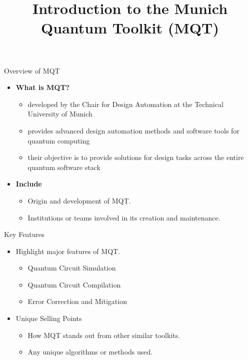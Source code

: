 \documentclass{beamer}
\title{Introduction to the Munich Quantum Toolkit (MQT)}
\begin{document}
\frame{\titlepage}

\begin{frame}{Overview of MQT}
    \begin{itemize}
        \item \textbf{What is MQT?}
        \begin{itemize}
            \item developed by the Chair for Design Automation at the Technical University of Munich
            \item provides advanced design automation methods and software tools for quantum computing
            \item their objective is to provide solutions for design tasks across the entire quantum software stack
        \end{itemize}
        \item \textbf{Include}
        \begin{itemize}
            \item Origin and development of MQT.
            \item Institutions or teams involved in its creation and maintenance.
        \end{itemize}
    \end{itemize}
\end{frame}

\begin{frame}{Key Features}
    \begin{itemize}
        \item Highlight major features of MQT.
        \begin{itemize}
            \item Quantum Circuit Simulation
            \item Quantum Circuit Compilation
            \item Error Correction and Mitigation
        \end{itemize}
        \item Unique Selling Points
        \begin{itemize}
            \item How MQT stands out from other similar toolkits.
            \item Any unique algorithms or methods used.
        \end{itemize}
    \end{itemize}
\end{frame}
\end{document}
